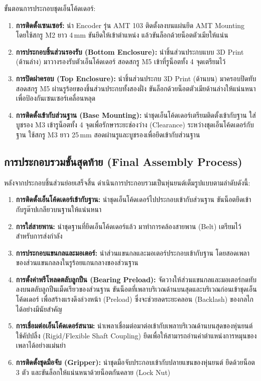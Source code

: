 ขั้นตอนการประกอบชุดเอ็นโค้ดเดอร์:
\begin{enumerate}
    \item \textbf{การติดตั้งเซนเซอร์:} นำ Encoder รุ่น AMT 103 ติดตั้งลงบนแผ่นยึด AMT Mounting โดยใช้สกรู M2 ยาว 4\,mm ขันยึดให้เข้าตำแหน่ง แล้วขันล็อกด้วยน็อตตัวเมียให้แน่น
    \item \textbf{การประกอบชิ้นส่วนรองรับ (Bottom Enclosure):} นำชิ้นส่วนประกบแบบ 3D Print (ด้านล่าง) มาวางรองรับตัวเอ็นโค้ดเดอร์ สอดสกรู M5 เข้าที่รูน็อตทั้ง 4 จุดเตรียมไว้
    \item \textbf{การปิดฝาครอบ (Top Enclosure):} นำชิ้นส่วนประกบ 3D Print (ด้านบน) มาครอบปิดทับ สอดสกรู M5 ผ่านรูร้อยของชิ้นส่วนประกบทั้งสองฝั่ง ขันล็อกด้วยน็อตตัวเมียด้านล่างให้แน่นหนา เพื่อป้องกันเซนเซอร์เคลื่อนหลุด
    \item \textbf{การติดตั้งเข้ากับส่วนฐาน (Base Mounting):} นำชุดเอ็นโค้ดเดอร์เตรียมติดตั้งเข้ากับฐาน ใส่บูชรอง M3 เข้ารูน็อตทั้ง 4 จุดเพื่อรักษาระยะช่องว่าง (Clearance) ระหว่างชุดเอ็นโค้ดเดอร์กับฐาน ใช้สกรู M3 ยาว 25\,mm สอดผ่านรูและบูชรองเพื่อยึดเข้ากับส่วนฐาน
\end{enumerate}

\subsection{การประกอบรวมขั้นสุดท้าย (Final Assembly Process)}
\label{subsec:final_assembly}

หลังจากประกอบชิ้นส่วนย่อยเสร็จสิ้น ดำเนินการประกอบรวมเป็นหุ่นยนต์เต็มรูปแบบตามลำดับดังนี้:

\begin{enumerate}
    \item \textbf{การติดตั้งเอ็นโค้ดเดอร์เข้ากับฐาน:} นำชุดเอ็นโค้ดเดอร์ไปประกอบเข้ากับส่วนฐาน ขันน็อตยึดเข้ากับรูต๊าปเกลียวบนฐานให้แน่นหนา
    \item \textbf{การใส่สายพาน:} นำชุดฐานที่ยึดเอ็นโค้ดเดอร์แล้ว มาทำการคล้องสายพาน (Belt) เตรียมไว้สำหรับการส่งกำลัง
    \item \textbf{การประกอบแขนกลและมอเตอร์:} นำส่วนแขนกลและมอเตอร์ประกอบเข้ากับฐาน โดยสอดเพลาของส่วนแขนกลลงในรูร้อยแกนกลางของส่วนฐาน
    \item \textbf{การตั้งค่าพรีโหลดตลับลูกปืน (Bearing Preload):} จัดวางให้ส่วนแขนกลและมอเตอร์กดทับลงบนตลับลูกปืนเม็ดเรียวของส่วนฐาน ขันน็อตที่เพลาบริเวณด้านบนสุดและบริเวณก่อนเข้าชุดเอ็นโค้ดเดอร์ เพื่อสร้างแรงดึงล่วงหน้า (Preload) ซึ่งจะช่วยลดระยะคลอน (Backlash) ของกลไกได้อย่างมีนัยสำคัญ
    \item \textbf{การเชื่อมต่อเอ็นโค้ดเดอร์สนาม:} นำเพลาเชื่อมต่อมาต่อเข้ากับเพลาบริเวณด้านบนสุดของหุ่นยนต์ ใช้คัปปลิ้ง (Rigid/Flexible Shaft Coupling) ยึดเพื่อให้สามารถอ่านค่าตำแหน่งการหมุนของเพลาได้อย่างแม่นยำ
    \item \textbf{การติดตั้งชุดมือจับ (Gripper):} นำชุดมือจับประกอบเข้ากับปลายแขนของหุ่นยนต์ ยึดด้วยน็อต 3 ตัว และขันล็อกให้แน่นหนาด้วยน็อตกันคลาย (Lock Nut)
\end{enumerate}

